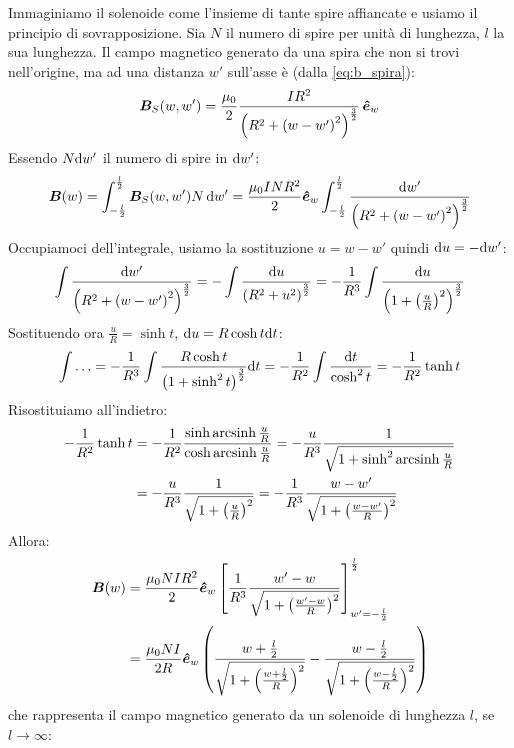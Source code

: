 \begin{Es}
  Immaginiamo il solenoide come l'insieme di tante spire affiancate e usiamo il principio di sovrapposizione. Sia $N$ il numero di spire per unità di lunghezza, $l$ la sua lunghezza. Il campo magnetico generato da una spira che non si trovi nell'origine, ma ad una distanza $w'$ sull'asse è (dalla \eqref{eq:b_spira}):
  \[
    \boldsymbol{B}_S(w,w')=\frac{\mu_0}{2}\frac{IR^2}{\left(R^2+\left(w-w'\right)^2\right)^{\frac{3}{2}}}\,\boldsymbol{\hat {e}}_w
  \]
  Essendo $N\mathrm{d} w'$ il numero di spire in $\mathrm{d} w'$:
  \begin{equation*}
    \boldsymbol{B}(w)=\int_{-\frac{l}{2}}^{\frac{l}{2}}\boldsymbol{B}_S(w,w')N\,\mathrm{d} w'=\frac{\mu_0INR^2}{2}\boldsymbol{\hat {e}}_w\int_{-\frac{l}{2}}^{\frac{l}{2}}\frac{\mathrm{d} w'}{\left(R^2+\left(w-w'\right)^2\right)^{\frac{3}{2}}}
  \end{equation*}
  Occupiamoci dell'integrale, usiamo la sostituzione $u=w-w'$ quindi $\mathrm{d} u=-\mathrm{d} w'$:
  \[
    \int\frac{\mathrm{d} w'}{\left(R^2+\left(w-w'\right)^2\right)^{\frac{3}{2}}} = -\int\frac{\mathrm{d} u}{\left(R^2+u^2\right)^{\frac{3}{2}}} = -\frac{1}{R^3}\int\frac{\mathrm{d} u}{\left(1+\left(\frac{u}{R}\right)^2\right)^{\frac{3}{2}}}
  \]
  Sostituendo ora $\frac{u}{R}=\sinh t$, $\mathrm{d} u=R\cosh t\mathrm{d} t$:
  \[\int\ldots = -\frac{1}{R^3}\int\frac{R\cosh t}{\left(1+\sinh^2t\right)^{\frac{3}{2}}}\mathrm{d} t=-\frac{1}{R^2}\int\frac{\mathrm{d} t}{\cosh^2 t}=-\frac{1}{R^2}\tanh t\]
  Risostituiamo all'indietro:
  \begin{align*}
    -\frac{1}{R^2}\tanh t & =-\frac{1}{R^2}\frac{\sinh\operatorname{arcsinh}\frac{u}{R}}{\cosh\operatorname{arcsinh}\frac{u}{R}}=-\frac{u}{R^3}\frac{1}{\sqrt{1+\sinh^2\operatorname{arcsinh}\frac{u}{R}}} \\
                          & =-\frac{u}{R^3}\frac{1}{\sqrt{1+\left(\frac{u}{R}\right)^2}}=-\frac{1}{R^3}\frac{w-w'}{\sqrt{1+\left(\frac{w-w'}{R}\right)^2}}
  \end{align*}
  Allora:
  \begin{align*}
    \boldsymbol{B}(w) & =\frac{\mu_0NIR^2}{2}\boldsymbol{\hat {e}}_w\left[\frac{1}{R^3}\frac{w'-w}{\sqrt{1+\left(\frac{w'-w}{R}\right)^2}}\right]_{w'=-\frac{l}{2}}^\frac{l}{2}                                               \\
             & =\dfrac{\mu_0NI}{2R}\boldsymbol{\hat {e}}_w\left(\dfrac{w+\frac{l}{2}}{\sqrt{1+\left(\frac{w+\frac{l}{2}}{R}\right)^2}}-\dfrac{w-\frac{l}{2}}{\sqrt{1+\left(\frac{w-\frac{l}{2}}{R}\right)^2}}\right)
  \end{align*}
  che rappresenta il campo magnetico generato da un solenoide di lunghezza $l$, se $l\to\infty$:
  \begin{equation}

\end{equation}
\end{Es}

